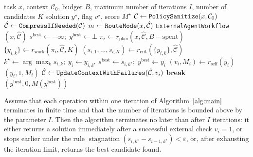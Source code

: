 \begin{algorithm}[htbp]
\caption{Hybrid-INoT: internal introspective cycle}\label{alg:main}
\begin{algorithmic}[1]
\Require task $x$, context $\mathcal{C}_0$, budget $B$, maximum number of iterations $I$, number of candidates $K$
\Ensure solution $y^\star$, flag $v^\star$, score $M^\star$
\State $\mathcal{C}\gets\textnormal{\texttt{PolicySanitize}}(x,\mathcal{C}_0)$
\State $\hat{\mathcal{C}}\gets\textnormal{\texttt{CompressIfNeeded}}(\mathcal{C})$ 
\State $m\gets\textnormal{\texttt{RouteMode}}(x,\hat{\mathcal{C}})$ 
 \Return \textnormal{\texttt{ExternalAgentWorkflow}}$(x,\hat{\mathcal{C}})$ \EndIf
\State $s^{\text{best}}\gets-\infty;\; y^{\text{best}}\gets\bot$
 \State $\pi_i\gets r_{\text{plan}}(x,\hat{\mathcal{C}},B-\text{spent})$
 \State $\{y_{i,k}\}\gets r_{\text{work}}(\pi_i,\hat{\mathcal{C}},K)$
 \State $(s_{i,1},\dots,s_{i,K})\gets r_{\text{crit}}(\{y_{i,k}\},\hat{\mathcal{C}})$
 \State $k^\star\gets\arg\max_k s_{i,k};\; y_i\gets y_{i,k^\star}$
  $s^{\text{best}}\gets s_{i,k^\star};\; y^{\text{best}}\gets y_i$ \EndIf
\State $(v_i,M_i)\gets r_{\text{self}}(y_i)$ 
  \Return $(y_i,1,M_i)$ \EndIf
 \State $\hat{\mathcal{C}}\gets\textnormal{\texttt{UpdateContextWithFailures}}(\hat{\mathcal{C}},v_i)$
  \textbf{break} \EndIf
\EndFor
\State \Return $(y^{\text{best}},0,M(y^{\text{best}}))$
\end{algorithmic}
\end{algorithm}

\begin{proposition}\label{prop:convergence}
Assume that each operation within one iteration of Algorithm~\ref{alg:main} terminates in finite time and that the number of iterations is bounded above by the parameter $I$. Then the algorithm terminates no later than after $I$ iterations: it either returns a solution immediately after a successful external check $v_i=1$, or stops earlier under the rule $\operatorname{stagnation}(s_{i,k^\star}-s_{i-1,k^\star})<\varepsilon$, or, after exhausting the iteration limit, returns the best candidate found.
\end{proposition}

